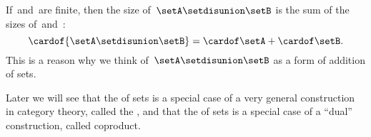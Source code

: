\begin{remark}
    If~\setA and~\setB are finite, then the size of~$\setA \setdisunion \setB$ is the sum of the sizes of~\setA and~\setB:
    \begin{equation}
        \cardof{ \setA \setdisunion \setB} = \cardof \setA  + \cardof \setB.
    \end{equation}
    This is a reason why we think of~$\setA \setdisunion \setB$ as a form of addition of sets.
\end{remark}

\begin{remark}
    Later we will see that the  of sets is a special case of a very general construction in category theory, called the , and that the  of sets is a special case of a ``dual'' construction, called coproduct.
\end{remark}
